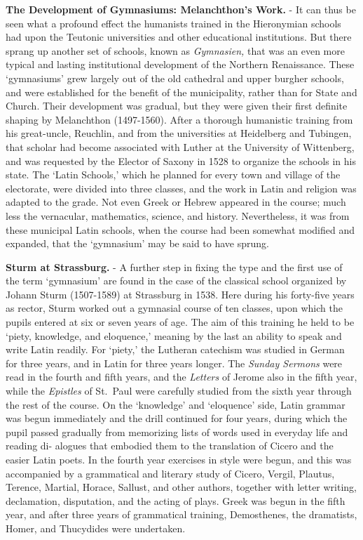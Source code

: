 \documentclass[]{book}
\begin{document}
\textbf{The Development of Gymnasiums: Melanchthon's Work.} - It can thus be seen what a profound effect the humanists trained in the Hieronymian schools had upon the Teutonic universities and other educational institutions. But there sprang up another set of schools, known as \emph{Gymnasien,} that was an even more typical and lasting institutional development of the Northern Renaissance. These `gymnasiums' grew largely out of the old cathedral and upper burgher schools, and were established for the benefit of the municipality, rather than for State and Church. Their development was gradual, but they were given their first definite shaping by Melanchthon (1497-1560). After a thorough humanistic training from his great-uncle, Reuchlin, and from the universities at Heidelberg and Tubingen, that scholar had become associated with Luther at the University of Wittenberg, and was requested by the Elector of Saxony in 1528 to organize the schools in his state. The `Latin Schools,' which he planned for every town and village of the electorate, were divided into three classes, and the work in Latin and religion was adapted to the grade. Not even Greek or Hebrew appeared in the course; much less the vernacular, mathematics, science, and history. Nevertheless, it was from these municipal Latin schools, when the course had been somewhat modified and expanded, that the `gymnasium' may be said to have sprung.

\textbf{Sturm at Strassburg.} - A further step in fixing the type and the first use of the term `gymnasium' are found in the case of the classical school organized by Johann Sturm (1507-1589) at Strassburg in 1538. Here during his forty-five years as rector, Sturm worked out a gymnasial course of ten classes, upon which the pupils entered at six or seven years of age. The aim of this training he held to be `piety, knowledge, and eloquence,' meaning by the last an ability to speak and write Latin readily. For `piety,' the Lutheran catechism was studied in German for three years, and in Latin for three years longer. The \emph{Sunday Sermons} were read in the fourth and fifth years, and the \emph{Letters} of Jerome also in the fifth year, while the \emph{Epistles} of St.~Paul were carefully studied from the sixth year through the rest of the course. On the `knowledge' and `eloquence' side, Latin grammar was begun immediately and the drill continued for four years, during which the pupil passed gradually from memorizing lists of words used in everyday life and reading di- alogues that embodied them to the translation of Cicero and the easier Latin poets. In the fourth year exercises in style were begun, and this was accompanied by a grammatical and literary study of Cicero, Vergil, Plautus, Terence, Martial, Horace, Sallust, and other authors, together with letter writing, declamation, disputation, and the acting of plays. Greek was begun in the fifth year, and after three years of grammatical training, Demosthenes, the dramatists, Homer, and Thucydides were undertaken.
\end{document}
